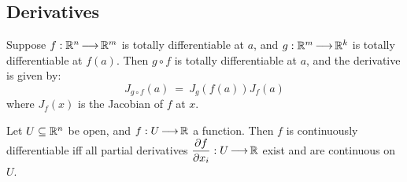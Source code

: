 \subsection{Derivatives}

\begin{thm}[title=Chain Rule]
    Suppose $ f:\mathbb{R}^{n} \operatorname{\longrightarrow} \mathbb{R}^{m} $ is totally differentiable at $ a $,
    and $ g:\mathbb{R}^{m} \operatorname{\longrightarrow} \mathbb{R}^{k} $ is totally differentiable at $ f(a) $. \vsp
    Then $ g \circ f $ is totally differentiable at $ a $, and the derivative is
    given by:
    \begin{equation*}
        J_{g\circ f}(a) \ = \ J_{g}(f(a))J_{f}(a)
    \end{equation*}
    where $ J_{f}(x) $ is the Jacobian of $ f $ at $ x $.
\end{thm}

\begin{thm}[title=Differentiability Theorem]
    Let $ U \subseteq \mathbb{R}^{n} $ be open, and $ f:U \operatorname{\longrightarrow} \mathbb{R} $ a function.
    Then $ f $ is continuously differentiable iff all partial derivatives
    $ \dfrac{\partial f}{\partial x_{i}}:U \operatorname{\longrightarrow} \mathbb{R} $ exist and are continuous on $ U $.
\end{thm}

